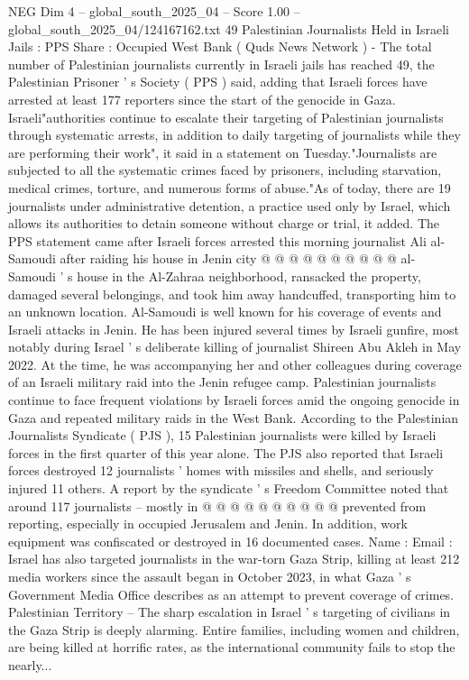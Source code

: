 \begin{textsample}{NEG Dim 4 – global\_south\_2025\_04 – Score 1.00 – global\_south\_2025\_04/124167162.txt}  \label{ex:f4_neg_217}
49 Palestinian Journalists Held in Israeli Jails : PPS Share : Occupied West Bank ( Quds News Network ) - The total number of Palestinian journalists currently in Israeli jails has reached 49, the Palestinian Prisoner ' s Society ( PPS ) said, adding that Israeli forces have arrested at least 177 reporters since the start of the genocide in Gaza.
Israeli"authorities continue to escalate their targeting of Palestinian journalists through systematic arrests, in addition to daily targeting of journalists while they are performing their work", it said in a statement on Tuesday."Journalists are subjected to all the systematic crimes faced by prisoners, including starvation, medical crimes, torture, and numerous forms of abuse."As of today, there are 19 journalists under administrative detention, a practice used only by Israel, which allows its authorities to detain someone without charge or trial, it added.
The PPS statement came after Israeli forces arrested this morning journalist Ali al-Samoudi after raiding his house in Jenin city @ @ @ @ @ @ @ @ @ @ al-Samoudi ' s house in the Al-Zahraa neighborhood, ransacked the property, damaged several belongings, and took him away handcuffed, transporting him to an unknown location.
Al-Samoudi is well known for his coverage of events and Israeli attacks in Jenin.
He has been injured several times by Israeli gunfire, most notably during Israel ' s deliberate killing of journalist Shireen Abu Akleh in May 2022.
At the time, he was accompanying her and other colleagues during coverage of an Israeli military raid into the Jenin refugee camp.
Palestinian journalists continue to face frequent violations by Israeli forces amid the ongoing genocide in Gaza and repeated military raids in the West Bank.
According to the Palestinian Journalists Syndicate ( PJS ), 15 Palestinian journalists were killed by Israeli forces in the first quarter of this year alone.
The PJS also reported that Israeli forces destroyed 12 journalists ' homes with missiles and shells, and seriously injured 11 others.
A report by the syndicate ' s Freedom Committee noted that around 117 journalists -- mostly in @ @ @ @ @ @ @ @ @ @ prevented from reporting, especially in occupied Jerusalem and Jenin.
In addition, work equipment was confiscated or destroyed in 16 documented cases.
Name : Email : Israel has also targeted journalists in the war-torn Gaza Strip, killing at least 212 media workers since the assault began in October 2023, in what Gaza ' s Government Media Office describes as an attempt to prevent coverage of crimes.
Palestinian Territory -- The sharp escalation in Israel ' s targeting of civilians in the Gaza Strip is deeply alarming.
Entire families, including women and children, are being killed at horrific rates, as the international community fails to stop the nearly...

\end{textsample}
